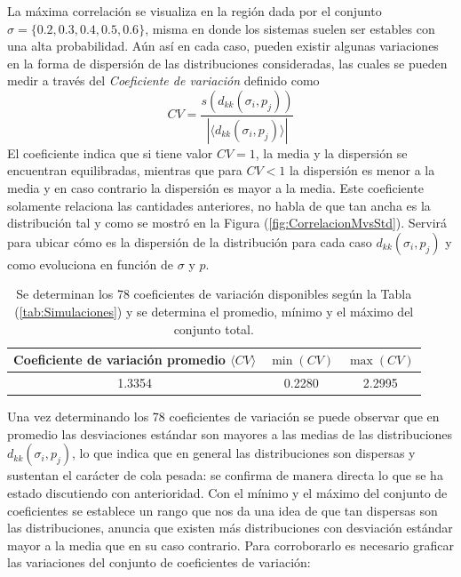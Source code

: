 La máxima correlación se visualiza en la región dada por el conjunto $\sigma=\{0.2,0.3,0.4,0.5,0.6\}$, misma en donde los sistemas suelen ser estables con una alta probabilidad. Aún así en cada caso, pueden existir algunas variaciones en la forma de dispersión de las distribuciones consideradas, las cuales se pueden medir a través del \textit{Coeficiente de variación} definido como
\begin{equation}\label{eqn:CV}
	CV=\frac{s(d_{kk}(\sigma_i,p_j))}{|\langle d_{kk}(\sigma_i,p_j)\rangle|}
\end{equation}
El coeficiente indica que si tiene valor $CV=1$, la media y la dispersión se encuentran equilibradas, mientras que para $CV<1$ la dispersión es menor a la media y en caso contrario la dispersión es mayor a la media. Este coeficiente solamente relaciona las cantidades anteriores, no habla de que tan ancha es la distribución tal y como se mostró en la Figura (\ref{fig:CorrelacionMvsStd}). Servirá para ubicar cómo es la dispersión de la distribución para cada caso $d_{kk}(\sigma_i,p_j)$ y como evoluciona en función de $\sigma$ y $p$.
\newpage
\begin{table}[h!]
	\centering
	\begin{tabular}{|c|c|c|}
		\hline
		Coeficiente de variación promedio $\langle CV\rangle$ & $\min(CV)$ & $\max(CV)$ \\ \hline
		1.3354 & 0.2280 & 2.2995\\ \hline
	\end{tabular}
	\caption{Se determinan los 78 coeficientes de variación disponibles según la Tabla (\ref{tab:Simulaciones}) y se determina el promedio, mínimo y el máximo del conjunto total.}
	\label{tab:CVs}
\end{table} 
Una vez determinando los 78 coeficientes de variación se puede observar que en promedio las desviaciones estándar son mayores a las medias de las distribuciones $d_{kk}(\sigma_i,p_j)$, lo que indica que en general las distribuciones son dispersas y sustentan el carácter de cola pesada: se confirma de manera directa lo que se ha estado discutiendo con anterioridad. Con el mínimo y el máximo del conjunto de coeficientes se establece un rango que nos da una idea de que tan dispersas son las distribuciones, anuncia que existen más distribuciones con desviación estándar mayor a la media que en su caso contrario. Para corroborarlo es necesario graficar las variaciones del conjunto de coeficientes de variación:
